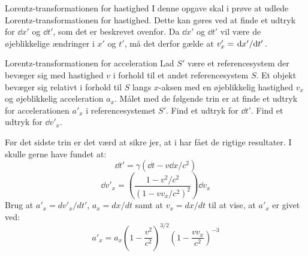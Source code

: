 \documentclass[crop=false, class=memoir]{standalone}
\begin{document}
\begin{opgave}[2]{Lorentz-transformationen for hastighed}
	I denne opgave skal i prøve at udlede Lorentz-transformationen for hastighed. Dette kan gøres ved at finde et udtryk for $\dd{x}'$ og $\dd{t}'$, som det er beskrevet ovenfor. Da $\dd{x}'$ og $\dd{t}'$ vil være de øjeblikkelige ændringer i $x'$ og $t'$, må det derfor gælde at $v'_x = \dv*{x'}{t'}$.
\end{opgave}

\begin{opgave}[3]{Lorentz-transformationen for acceleration}
	Lad $S'$ være et referencesystem der bevæger sig med hastighed $v$ i forhold til et andet referencesystem $S$. Et objekt bevæger sig relativt i forhold til $S$ langs $x$-aksen med en øjeblikkelig hastighed $v_x$ og øjeblikkelig acceleration $a_x$. Målet med de følgende trin er at finde et udtryk for accelerationen $a'_x$ i referencesystemet $S'$.
	\opg Find et udtryk for $\dd{t'}$.
	\opg Find et udtryk for $\dd{v'_x}$.
	
	
	Før det sidste trin er det værd at sikre jer, at i har fået de rigtige resultater. I skulle gerne have fundet at:
	$$\dd{t'} = \gamma \left( \dd{t} - v \dd{x} / c^2 \right)$$
	$$\dd{v'_x} = \left( \frac{1 - v^2/c^2}{ \left( 1-vv_x/c^2 \right)^2 } \right) \dd{v_x}$$
	\opg Brug at $a'_x = dv'_x / dt'$, $a_x = dx/dt$ samt at $v_x = dx/dt$ til at vise, at $a'_x$ er givet ved:
	$$a'_x = a_x \left( 1- \frac{v^2}{c^2} \right)^{3/2} \left( 1 - \frac{vv_x}{c^2}  \right)^{-3}$$
\end{opgave}
\end{document}
